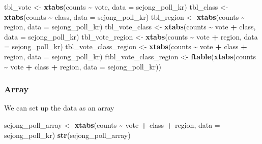 \documentclass[
]{article}
\newenvironment{Shaded}{\begin{snugshade}}{\end{snugshade}}
\newcommand{\DataTypeTok}[1]{\textcolor[rgb]{0.13,0.29,0.53}{#1}}
\newcommand{\KeywordTok}[1]{\textcolor[rgb]{0.13,0.29,0.53}{\textbf{#1}}}
\newcommand{\NormalTok}[1]{#1}
\newcommand{\OperatorTok}[1]{\textcolor[rgb]{0.81,0.36,0.00}{\textbf{#1}}}
\newcommand{\StringTok}[1]{\textcolor[rgb]{0.31,0.60,0.02}{#1}}
\begin{document}
\begin{Shaded}
\begin{Highlighting}[]
\NormalTok{tbl\_vote \textless{}{-}}\StringTok{ }\KeywordTok{xtabs}\NormalTok{(counts }\OperatorTok{\textasciitilde{}}\StringTok{ }\NormalTok{vote, }
                  \DataTypeTok{data =}\NormalTok{ sejong\_poll\_kr)}
\NormalTok{tbl\_class \textless{}{-}}\StringTok{ }\KeywordTok{xtabs}\NormalTok{(counts }\OperatorTok{\textasciitilde{}}\StringTok{ }\NormalTok{class, }
                   \DataTypeTok{data =}\NormalTok{ sejong\_poll\_kr)}
\NormalTok{tbl\_region \textless{}{-}}\StringTok{ }\KeywordTok{xtabs}\NormalTok{(counts }\OperatorTok{\textasciitilde{}}\StringTok{ }\NormalTok{region, }
                    \DataTypeTok{data =}\NormalTok{ sejong\_poll\_kr)}
\NormalTok{tbl\_vote\_class \textless{}{-}}\StringTok{ }\KeywordTok{xtabs}\NormalTok{(counts }\OperatorTok{\textasciitilde{}}\StringTok{ }\NormalTok{vote }\OperatorTok{+}\StringTok{ }\NormalTok{class, }
                        \DataTypeTok{data =}\NormalTok{ sejong\_poll\_kr)}
\NormalTok{tbl\_vote\_region \textless{}{-}}\StringTok{ }\KeywordTok{xtabs}\NormalTok{(counts }\OperatorTok{\textasciitilde{}}\StringTok{ }\NormalTok{vote }\OperatorTok{+}\StringTok{ }\NormalTok{region, }
                         \DataTypeTok{data =}\NormalTok{ sejong\_poll\_kr)}
\NormalTok{tbl\_vote\_class\_region \textless{}{-}}\StringTok{ }\KeywordTok{xtabs}\NormalTok{(counts }\OperatorTok{\textasciitilde{}}\StringTok{ }\NormalTok{vote }\OperatorTok{+}\StringTok{ }\NormalTok{class }\OperatorTok{+}\StringTok{ }\NormalTok{region, }
                               \DataTypeTok{data =}\NormalTok{ sejong\_poll\_kr)}
\NormalTok{ftbl\_vote\_class\_region \textless{}{-}}\StringTok{ }\KeywordTok{ftable}\NormalTok{(}\KeywordTok{xtabs}\NormalTok{(counts }\OperatorTok{\textasciitilde{}}\StringTok{ }\NormalTok{vote }\OperatorTok{+}\StringTok{ }\NormalTok{class }\OperatorTok{+}\StringTok{ }\NormalTok{region,}
                                       \DataTypeTok{data =}\NormalTok{ sejong\_poll\_kr))}
\end{Highlighting}
\end{Shaded}

\hypertarget{array}{%
\subsubsection{Array}\label{array}}

We can set up the data as an array

\begin{Shaded}
\begin{Highlighting}[]
\NormalTok{sejong\_poll\_array \textless{}{-}}\StringTok{ }\KeywordTok{xtabs}\NormalTok{(counts }\OperatorTok{\textasciitilde{}}\StringTok{ }\NormalTok{vote }\OperatorTok{+}\StringTok{ }\NormalTok{class }\OperatorTok{+}\StringTok{ }\NormalTok{region, }
                           \DataTypeTok{data =}\NormalTok{ sejong\_poll\_kr)}
\KeywordTok{str}\NormalTok{(sejong\_poll\_array)}
\end{Highlighting}
\end{Shaded}
\end{document}
